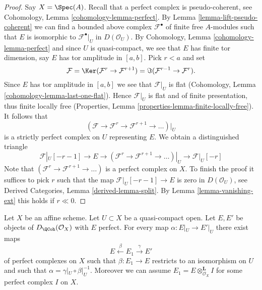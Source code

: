 \begin{proof}
Say $X = \Spec(A)$. Recall that a perfect complex is
pseudo-coherent, see
Cohomology, Lemma \ref{cohomology-lemma-perfect}.
By Lemma \ref{lemma-lift-pseudo-coherent} we can find a bounded above complex
$\mathcal{F}^\bullet$ of finite free $A$-modules such that $E$ is
isomorphic to $\mathcal{F}^\bullet|_U$ in $D(\mathcal{O}_U)$.
By Cohomology, Lemma \ref{cohomology-lemma-perfect} and since
$U$ is quasi-compact, we see that $E$ has finite tor dimension, say
$E$ has tor amplitude in $[a, b]$. Pick $r < a$ and set
$$
\mathcal{F} = \Ker(\mathcal{F}^{r} \to \mathcal{F}^{r + 1})
= \Im(\mathcal{F}^{r - 1} \to \mathcal{F}^r).
$$
Since $E$ has tor amplitude in $[a, b]$ we see that $\mathcal{F}|_U$ is
flat (Cohomology, Lemma \ref{cohomology-lemma-last-one-flat}).
Hence $\mathcal{F}|_U$ is flat and of finite presentation, thus finite
locally free (Properties, Lemma \ref{properties-lemma-finite-locally-free}).
It follows that
$$
(\mathcal{F} \to \mathcal{F}^r \to \mathcal{F}^{r + 1} \to \ldots )|_U
$$
is a strictly perfect complex on $U$ representing $E$.
We obtain a distinguished triangle
$$
\mathcal{F}|_U[- r - 1] \to E \to
(\mathcal{F}^r \to \mathcal{F}^{r + 1} \to \ldots )|_U \to
\mathcal{F}|_U[- r]
$$
Note that $(\mathcal{F}^r \to \mathcal{F}^{r + 1} \to \ldots )$ is
a perfect complex on $X$. To finish the proof it suffices to pick $r$
such that the map
$\mathcal{F}|_U[- r - 1] \to E$ is zero in $D(\mathcal{O}_U)$, see
Derived Categories, Lemma \ref{derived-lemma-split}. By
Lemma \ref{lemma-vanishing-ext} this holds if $r \ll 0$.
\end{proof}

\begin{lemma}
\label{lemma-lift-map}
Let $X$ be an affine scheme. Let $U \subset X$ be a quasi-compact open.
Let $E, E'$ be objects of $D_\QCoh(\mathcal{O}_X)$ with $E$ perfect.
For every map $\alpha : E|_U \to E'|_U$ there exist maps
$$
E \xleftarrow{\beta} E_1 \xrightarrow{\gamma} E'
$$
of perfect complexes on $X$ such that $\beta : E_1 \to E$ restricts to an
isomorphism on $U$ and such that $\alpha = \gamma|_U \circ \beta|_U^{-1}$.
Moreover we can assume $E_1 = E \otimes_{\mathcal{O}_X}^\mathbf{L} I$
for some perfect complex $I$ on $X$.
\end{lemma}

